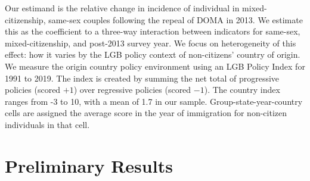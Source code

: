 \documentclass[
  11pt,
]{article}
\begin{document}
Our estimand is the relative change in incidence of individual in mixed-citizenship, same-sex couples following the repeal of DOMA in 2013. We estimate this as the coefficient to a three-way interaction between indicators for same-sex, mixed-citizenship, and post-2013 survey year. We focus on heterogeneity of this effect: how it varies by the LGB policy context of non-citizens' country of origin. We measure the origin country policy environment using an LGB Policy Index for 1991 to 2019. The index is created by summing the net total of progressive policies (scored \(+1\)) over regressive policies (scored \(-1\)). The country index ranges from -3 to 10, with a mean of 1.7 in our sample. Group-state-year-country cells are assigned the average score in the year of immigration for non-citizen individuals in that cell.

\hypertarget{preliminary-results}{%
\section{Preliminary Results}\label{preliminary-results}}

 
  \providecommand{\huxb}[2]{\arrayrulecolor[RGB]{#1}\global\arrayrulewidth=#2pt}
  \providecommand{\huxvb}[2]{\color[RGB]{#1}\vrule width #2pt}
  \providecommand{\huxtpad}[1]{\rule{0pt}{#1}}
  \providecommand{\huxbpad}[1]{\rule[-#1]{0pt}{#1}}
\end{document}
